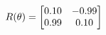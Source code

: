\documentclass[preview]{standalone}
\begin{document}
\begin{align*}
\special{dvisvgm:raw <g id='unique000'>}R(\theta) = \begin{bmatrix}0.10 & -0.99\\0.99 & 0.10\end{bmatrix}\special{dvisvgm:raw </g>}
\end{align*}
\end{document}
